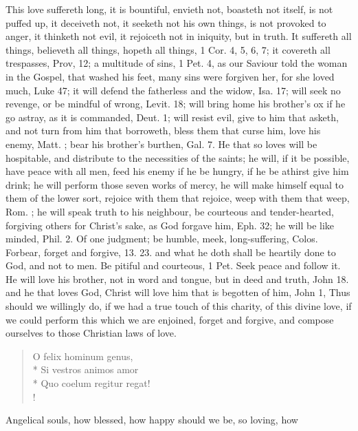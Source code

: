 {This love suffereth long, it is bountiful, envieth not, boasteth not
itself, is not puffed up, it deceiveth not, it seeketh not his own
things, is not provoked to anger, it thinketh not evil, it rejoiceth
not in iniquity, but in truth. It suffereth all things, believeth all
things, hopeth all things, 1 Cor.  4, 5, 6, 7; it covereth all
trespasses, Prov,  12; a multitude of sins, 1 Pet. 4, as our Saviour
told the woman in the Gospel, that washed his feet, many sins were
forgiven her, for she loved much, Luke  47; it will defend the
fatherless and the widow, Isa.  17; will seek no revenge, or be
mindful of wrong, Levit.  18; will bring home his brother's ox if
he go astray, as it is commanded, Deut.  1; will resist evil, give
to him that asketh, and not turn from him that borroweth, bless them
that curse him, love his enemy, Matt. ; bear his brother's burthen,
Gal.  7. He that so loves will be hospitable, and distribute to the
necessities of the saints; he will, if it be possible, have peace with
all men, feed his enemy if he be hungry, if he be athirst give him
drink; he will perform those seven works of mercy, he will make himself
equal to them of the lower sort, rejoice with them that rejoice, weep
with them that weep, Rom. ; he will speak truth to his neighbour, be
courteous and tender-hearted, forgiving others for Christ's sake, as
God forgave him, Eph.  32; he will be like minded, Phil.  2. Of
one judgment; be humble, meek, long-suffering, Colos.  Forbear,
forget and forgive,  13. 23. and what he doth shall be heartily
done to God, and not to men. Be pitiful and courteous, 1 Pet.  Seek
peace and follow it. He will love his brother, not in word and tongue,
but in deed and truth, John  18. and he that loves God, Christ will
love him that is begotten of him, John  1, \etc{} Thus should we
willingly do, if we had a true touch of this charity, of this divine
love, if we could perform this which we are enjoined, forget and
forgive, and compose ourselves to those Christian laws of love.
%
\begin{latin}
\begin{verse}
O felix hominum genus,\\*
Si vestros animos amor\\*
Quo coelum regitur regat!\\!
\end{verse}
\end{latin}
%
Angelical souls, how blessed, how happy should we be, so loving, how
}
